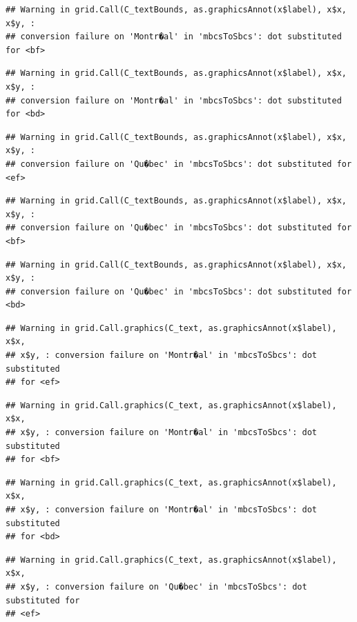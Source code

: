 \documentclass[]{article}
\begin{document}
\begin{verbatim}
## Warning in grid.Call(C_textBounds, as.graphicsAnnot(x$label), x$x, x$y, :
## conversion failure on 'Montr�al' in 'mbcsToSbcs': dot substituted for <bf>
\end{verbatim}

\begin{verbatim}
## Warning in grid.Call(C_textBounds, as.graphicsAnnot(x$label), x$x, x$y, :
## conversion failure on 'Montr�al' in 'mbcsToSbcs': dot substituted for <bd>
\end{verbatim}

\begin{verbatim}
## Warning in grid.Call(C_textBounds, as.graphicsAnnot(x$label), x$x, x$y, :
## conversion failure on 'Qu�bec' in 'mbcsToSbcs': dot substituted for <ef>
\end{verbatim}

\begin{verbatim}
## Warning in grid.Call(C_textBounds, as.graphicsAnnot(x$label), x$x, x$y, :
## conversion failure on 'Qu�bec' in 'mbcsToSbcs': dot substituted for <bf>
\end{verbatim}

\begin{verbatim}
## Warning in grid.Call(C_textBounds, as.graphicsAnnot(x$label), x$x, x$y, :
## conversion failure on 'Qu�bec' in 'mbcsToSbcs': dot substituted for <bd>
\end{verbatim}

\begin{verbatim}
## Warning in grid.Call.graphics(C_text, as.graphicsAnnot(x$label), x$x,
## x$y, : conversion failure on 'Montr�al' in 'mbcsToSbcs': dot substituted
## for <ef>
\end{verbatim}

\begin{verbatim}
## Warning in grid.Call.graphics(C_text, as.graphicsAnnot(x$label), x$x,
## x$y, : conversion failure on 'Montr�al' in 'mbcsToSbcs': dot substituted
## for <bf>
\end{verbatim}

\begin{verbatim}
## Warning in grid.Call.graphics(C_text, as.graphicsAnnot(x$label), x$x,
## x$y, : conversion failure on 'Montr�al' in 'mbcsToSbcs': dot substituted
## for <bd>
\end{verbatim}

\begin{verbatim}
## Warning in grid.Call.graphics(C_text, as.graphicsAnnot(x$label), x$x,
## x$y, : conversion failure on 'Qu�bec' in 'mbcsToSbcs': dot substituted for
## <ef>
\end{verbatim}
\end{document}
